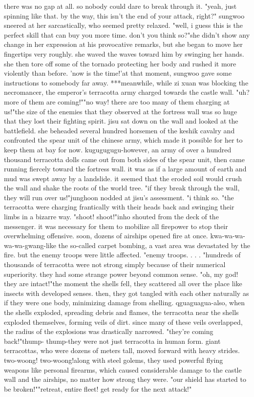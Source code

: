 there was no gap at all.
 so nobody could dare to break through it.
"yeah, just spinning like that.
 by the way, this isn't the end of your attack, right?" sungwoo sneered at her sarcastically, who seemed pretty relaxed.
 "well, i guess this is the perfect skill that can buy you more time.
 don't you think so?"she didn't show any change in her expression at his provocative remarks, but she began to move her fingertips very roughly.
 she waved the waves toward him by swinging her hands.
 she then tore off some of the tornado protecting her body and rushed it more violently than before.
'now is the time!'at that moment, sungwoo gave some instructions to somebody far away.
***meanwhile, while zi xuan was blocking the necromancer, the emperor's terracotta army charged towards the castle wall.
"uh? more of them are coming!""no way! there are too many of them charging at us!"the size of the enemies that they observed at the fortress wall was so huge that they lost their fighting spirit.
 jisu sat down on the wall and looked at the battlefield.
 she beheaded several hundred horsemen of the keshik cavalry and confronted the spear unit of the chinese army, which made it possible for her to keep them at bay for now.
kugugugugu-however, an army of over a hundred thousand terracotta dolls came out from both sides of the spear unit, then came running fiercely toward the fortress wall.
it was as if a large amount of earth and mud was swept away by a landslide.
 it seemed that the eroded soil would crush the wall and shake the roots of the world tree.
"if they break through the wall, they will run over us!"junghoon nodded at jisu's assessment.
 "i think so.
"the terracotta were charging frantically with their heads back and swinging their limbs in a bizarre way.
"shoot! shoot!"inho shouted from the deck of the messenger.
 it was necessary for them to mobilize all firepower to stop their overwhelming offensive.
 soon, dozens of airships opened fire at once.
kwa-wa-wa-wa-wa-gwang-like the so-called carpet bombing, a vast area was devastated by the fire.
but the enemy troops were little affected.
 "enemy troops.
.
.
.
"hundreds of thousands of terracotta were not strong simply because of their numerical superiority.
 they had some strange power beyond common sense.
"oh, my god! they are intact!"the moment the shells fell, they scattered all over the place like insects with developed senses.
then, they got tangled with each other naturally as if they were one body, minimizing damage from shelling.
qguaguagua-also, when the shells exploded, spreading debris and flames, the terracotta near the shells exploded themselves, forming veils of dirt.
 since many of these veils overlapped, the radius of the explosions was drastically narrowed.
"they're coming back!"thump- thump-they were not just terracotta in human form.
 giant terracottas, who were dozens of meters tall, moved forward with heavy strides.
two-woong! two-woong!along with steel golems, they used powerful flying weapons like personal firearms, which caused considerable damage to the castle wall and the airships, no matter how strong they were.
"our shield has started to be broken!""retreat, entire fleet! get ready for the next attack!"

